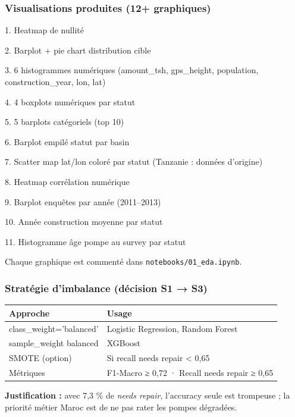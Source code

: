 \documentclass[11pt,a4paper]{report}
\begin{document}
\subsubsection{Visualisations produites (12+ graphiques)}



1. Heatmap de nullité

2. Barplot + pie chart distribution cible

3. 6 histogrammes numériques (amount\_tsh, gps\_height, population, construction\_year, lon, lat)

4. 4 boxplots numériques par statut

5. 5 barplots catégoriels (top 10)

6. Barplot empilé statut par basin

7. Scatter map lat/lon coloré par statut (Tanzanie : données d'origine)

8. Heatmap corrélation numérique

9. Barplot enquêtes par année (2011–2013)

10. Année construction moyenne par statut

11. Histogramme âge pompe au survey par statut



Chaque graphique est commenté dans \texttt{notebooks/01\_eda.ipynb}.



\subsubsection{Stratégie d'imbalance (décision S1 → S3)}



\begin{longtable}{@{}ll@{}}
\toprule
Approche & Usage \\
\midrule
class\_weight='balanced' & Logistic Regression, Random Forest \\
sample\_weight balanced & XGBoost \\
SMOTE (option) & Si recall needs repair < 0,65 \\
Métriques & F1-Macro ≥ 0,72 · Recall needs repair ≥ 0,65 \\
\bottomrule
\end{longtable}




\textbf{Justification :} avec 7,3 \% de \textit{needs repair}, l'accuracy seule est trompeuse ; la priorité métier Maroc est de ne pas rater les pompes dégradées.
\end{document}
